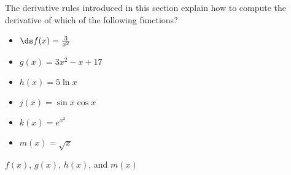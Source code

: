 {The derivative rules introduced in this section explain how to compute the derivative of which of the following functions?

\noindent\begin{minipage}[t]{.5\linewidth}
\begin{itemize}
\item	$\ds f(x) = \frac{3}{x^2}$ 
\item	$g(x) = 3x^2-x+17$ 
\item	$h(x) = 5\ln x$ 
\end{itemize}
\end{minipage}%
\begin{minipage}[t]{.5\linewidth}
\begin{itemize}
\item	$j(x) = \sin x \cos x$ 
\item		$k(x) = e^{x^2}$
\item	$m(x) = \sqrt{x}$
\end{itemize}
\end{minipage}
}
{$f(x)$, $g(x)$, $h(x)$, and $m(x)$}
